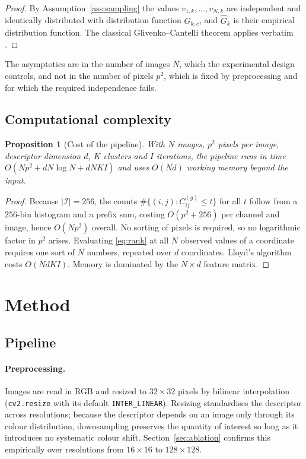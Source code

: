 \documentclass[pdflatex,sn-basic]{sn-jnl}
\theoremstyle{thmstyleone}%
\newtheorem{proposition}[theorem]{Proposition}%
\theoremstyle{thmstyletwo}%
\theoremstyle{thmstylethree}%
\begin{document}
\begin{proof}
By Assumption~\ref{ass:sampling} the values $v_{1,k},\dots,v_{N,k}$ are
independent and identically distributed with distribution function $G_{k,c}$,
and $\widehat{G}_k$ is their empirical distribution function. The classical
Glivenko--Cantelli theorem applies verbatim \cite{ref:wasserman2006}.
\end{proof}

The asymptotics are in the number of images $N$, which the experimental design
controls, and not in the number of pixels $p^2$, which is fixed by
preprocessing and for which the required independence fails.

\subsection{Computational complexity}\label{sec:complexity}

\begin{proposition}[Cost of the pipeline]\label{prop:complexity}
With $N$ images, $p^2$ pixels per image, descriptor dimension $d$, $K$ clusters
and $I$ iterations, the pipeline runs in time
$O(Np^{2}+dN\log N+dNKI)$ and uses $O(Nd)$ working memory beyond the input.
\end{proposition}

\begin{proof}
Because $|\mathcal{I}|=256$, the counts $\#\{(i,j):C^{(g)}_{ij}\le t\}$ for all
$t$ follow from a $256$-bin histogram and a prefix sum, costing $O(p^{2}+256)$
per channel and image, hence $O(Np^{2})$ overall. No sorting of pixels is
required, so no logarithmic factor in $p^2$ arises. Evaluating \eqref{eq:rank}
at all $N$ observed values of a coordinate requires one sort of $N$ numbers,
repeated over $d$ coordinates. Lloyd's algorithm costs $O(NdKI)$. Memory is
dominated by the $N\times d$ feature matrix.
\end{proof}

\section{Method}\label{sec:method}

\subsection{Pipeline}\label{sec:pipeline}

\paragraph{Preprocessing.} Images are read in RGB and resized to $32\times32$
pixels by bilinear interpolation (\texttt{cv2.resize} with its default
\texttt{INTER\_LINEAR}). Resizing standardises the descriptor across
resolutions; because the descriptor depends on an image only through its colour
distribution, downsampling preserves the quantity of interest so long as it
introduces no systematic colour shift. Section~\ref{sec:ablation} confirms this
empirically over resolutions from $16\times16$ to $128\times128$.
\end{document}

